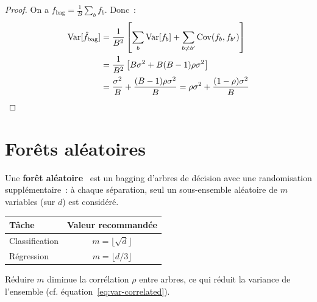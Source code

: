\begin{proof}
On a $\hat{f}_{\text{bag}} = \frac{1}{B}\sum_b f_b$. Donc~:
\begin{align}
  \mathrm{Var}[\hat{f}_{\text{bag}}]
  &= \frac{1}{B^2}\left[\sum_b \mathrm{Var}[f_b]
    + \sum_{b \neq b'} \mathrm{Cov}(f_b, f_{b'})\right] \\
  &= \frac{1}{B^2}\left[B\sigma^2 + B(B-1)\rho\sigma^2\right] \\
  &= \frac{\sigma^2}{B} + \frac{(B-1)\rho\sigma^2}{B}
  = \rho\sigma^2 + \frac{(1-\rho)\sigma^2}{B}
\end{align}
\end{proof}

\section{For\^ets al\'eatoires}
\label{sec:random-forests}

\begin{definition}
Une \textbf{for\^et al\'eatoire}~\cite{hastie2009} est un bagging d'arbres de
d\'ecision avec une randomisation suppl\'ementaire~: \`a chaque s\'eparation,
seul un sous-ensemble al\'eatoire de $m$ variables (sur $d$) est
consid\'er\'e.
\end{definition}

\begin{formules}[title=\textbf{Choix de $m$ (nombre de variables candidates)}]
\begin{center}
\begin{tabular}{lc}
\toprule
\textbf{T\^ache} & \textbf{Valeur recommand\'ee} \\
\midrule
Classification & $m = \lfloor\sqrt{d}\rfloor$ \\
R\'egression & $m = \lfloor d/3 \rfloor$ \\
\bottomrule
\end{tabular}
\end{center}
R\'eduire $m$ diminue la corr\'elation $\rho$ entre arbres, ce qui r\'eduit
la variance de l'ensemble (cf. \'equation~\eqref{eq:var-correlated}).
\end{formules}

